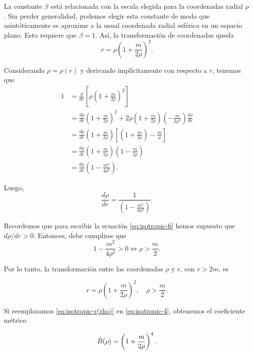 \documentclass[letterpaper,11pt]{article}
\begin{document}
La constante $\beta$ está relacionada con la escala elegida para la coordenadas radial $\rho$. Sin perder generalidad, podemos elegir esta constante de modo que asintóticamente se aproxime a la usual coordenada radial esférica en un espacio plano. Esto requiere que $\beta = 1$. Así, la transformación de coordenadas queda 
\begin{equation}
r = \rho \left( 1 + \frac{m}{2\rho} \right)^2.
\end{equation}

Considerando $\rho = \rho(r)$ y derivando implícitamente con respecto a $r$, tenemos que
\begin{align}
1 &= \frac{d}{dr} \left[ \rho \left( 1 + \frac{m}{2\rho} \right)^2 \right] \nonumber \\
 &= \frac{d\rho}{dr} \left( 1 + \frac{m}{2\rho} \right)^2 + 2 \rho \left( 1 + \frac{m}{2\rho} \right) \left( - \frac{m}{2\rho^2} \right) \frac{d\rho}{dr} \nonumber\\
 &= \frac{d\rho}{dr} \left(1 + \frac{m}{2\rho} \right) \left[ \left(1 + \frac{m}{2\rho} \right) - \frac{m}{\rho}\right] \nonumber\\
 &= \frac{d\rho}{dr} \left(1 + \frac{m}{2\rho} \right)  \left(1 - \frac{m}{2\rho} \right)\nonumber\\
 &= \frac{d\rho}{dr} \left(1 - \frac{m^2}{4\rho^2} \right). 
\end{align}

Luego, 
\begin{equation}
\frac{d\rho}{dr} = \frac{1}{ \left(1 - \frac{m^2}{4\rho^2} \right)}.
\end{equation}

Recordemos que para escribir la ecuación \eqref{eq:isotropic-6} hemos supuesto que  $d\rho/dr > 0$. Entonces, debe cumplirse que 
\begin{equation}
1 - \frac{m^2}{4\rho^2} > 0 \Leftrightarrow \rho >  \frac{m}{2}.
\end{equation}

Por lo tanto, la transformación entre las coordenadas $\rho$ y $r$, con $r > 2m$, es
\begin{shaded}
\begin{equation} \label{eq:isotropic-r(rho)}
    r = \rho \left( 1 + \frac{m}{2\rho} \right)^2, \quad \rho > \frac{m}{2}.
\end{equation}    
\end{shaded}

Si reemplazamos \eqref{eq:isotropic-r(rho)} en \eqref{eq:isotropic-4}, obtenemos el coeficiente métrico 
\begin{shaded}
\begin{equation} \label{eq:metric-isotropic-B}
    \Tilde{B}(\rho) = \left( 1 + \frac{m}{2\rho} \right)^4.
\end{equation}    
\end{shaded}
\end{document}
